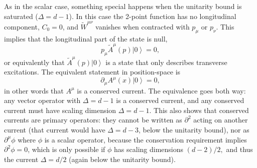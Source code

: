 \documentclass[a4paper,12pt]{article}
\newcommand{\ket}[1]{\left| #1 \right\rangle}
\numberwithin{equation}{section}
\begin{document}
As in the scalar case, something special happens when the unitarity bound is saturated ($\Delta = d - 1$). In this case the 2-point function has no longitudinal component, $C_0 = 0$,
and $\widetilde{W}^{\mu\nu}$ vanishes when contracted with $p_\mu$ or $p_\nu$. This implies that the longitudinal part of the state is null,
\begin{equation}
	p_\mu \widetilde{A}^\mu(p) \ket{0} = 0,
\end{equation}
or equivalently that $\widetilde{A}^\mu(p) \ket{0}$ is a state that only describes transverse excitations.
The equivalent statement in position-space is 
\begin{equation}
	\partial_\mu A^\mu(x) \ket{0} = 0,
\end{equation}
in other words that $A^\mu$ is a conserved current.
The equivalence goes both way: any vector operator with $\Delta = d - 1$ is a conserved current, and any conserved current must have scaling dimension $\Delta = d - 1$. This also shows that conserved currents are  primary operators: they cannot be written as $\partial^2$ acting on another current (that current would have $\Delta = d - 3$, below the unitarity bound), nor as $\partial^\mu \phi$ where $\phi$ is a scalar operator, because the conservation requirement implies $\partial^2 \phi = 0$, which is only possible if $\phi$ has scaling dimensions $(d-2)/2,$ and thus the current $\Delta = d/2$ (again below the unitarity bound).
\end{document}
